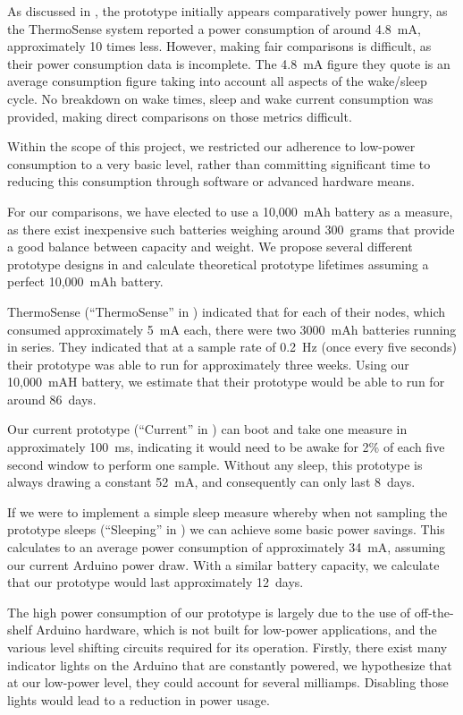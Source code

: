 \documentclass[../thesis/thesis.tex]{subfiles}
\begin{document}
As discussed in , the prototype initially appears comparatively power hungry, as the ThermoSense system reported a power consumption of around 4.8~mA, approximately 10 times less. However, making fair comparisons is difficult, as their power consumption data is incomplete. The 4.8~mA figure they quote is an average consumption figure taking into account all aspects of the wake/sleep cycle. No breakdown on wake times, sleep and wake current consumption was provided, making direct comparisons on those metrics difficult.

Within the scope of this project, we restricted our adherence to low-power consumption to a very basic level, rather than committing significant time to reducing this consumption through software or advanced hardware means.

For our comparisons, we have elected to use a 10,000~mAh battery as a measure, as there exist inexpensive such batteries weighing around 300~grams \cite{AdafruitBattery} that provide a good balance between capacity and weight. We propose several different prototype designs in  and calculate theoretical prototype lifetimes assuming a perfect 10,000~mAh battery.

ThermoSense (``ThermoSense'' in ) indicated that for each of their nodes, which consumed approximately 5~mA each, there were two 3000~mAh batteries running in series. They indicated that at a sample rate of 0.2~Hz (once every five seconds) their prototype was able to run for approximately three weeks. Using our 10,000~mAH battery, we estimate that their prototype would be able to run for around 86~days.

Our current prototype (``Current'' in ) can boot and take one measure in approximately 100~ms, indicating it would need to be awake for 2\% of each five second window to perform one sample. Without any sleep, this prototype is always drawing a constant 52~mA, and consequently can only last 8~days.

If we were to implement a simple sleep measure whereby when not sampling the prototype sleeps (``Sleeping'' in ) we can achieve some basic power savings. This calculates to an average power consumption of approximately 34~mA, assuming our current Arduino power draw. With a similar battery capacity, we calculate that our prototype would last approximately 12~days.

The high power consumption of our prototype is largely due to the use of off-the-shelf Arduino hardware, which is not built for low-power applications, and the various level shifting circuits required for its operation. Firstly, there exist many indicator lights on the Arduino that are constantly powered, we hypothesize that at our low-power level, they could account for several milliamps. Disabling those lights would lead to a reduction in power usage.
\end{document}
